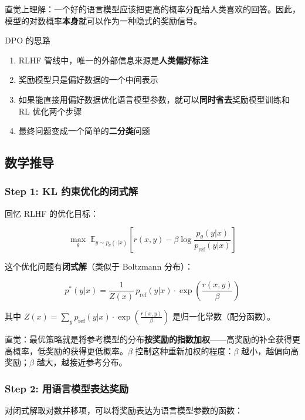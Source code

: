 \documentclass[a4paper]{article}
\begin{document}
直觉上理解：一个好的语言模型应该把更高的概率分配给人类喜欢的回答。因此，模型的对数概率\textbf{本身}就可以作为一种隐式的奖励信号。

\begin{importantbox}{DPO 的思路}
\begin{enumerate}
    \item RLHF 管线中，唯一的外部信息来源是\textbf{人类偏好标注}
    \item 奖励模型只是偏好数据的一个中间表示
    \item 如果能直接用偏好数据优化语言模型参数，就可以\textbf{同时省去}奖励模型训练和 RL 优化两个步骤
    \item 最终问题变成一个简单的\textbf{二分类}问题
\end{enumerate}
\end{importantbox}

\subsection{数学推导}

\subsubsection{Step 1: KL 约束优化的闭式解}

回忆 RLHF 的优化目标：

$$\max_\theta \; \mathbb{E}_{y \sim p_\theta(\cdot|x)} \left[ r(x, y) - \beta \log \frac{p_\theta(y|x)}{p_{\text{ref}}(y|x)} \right]$$

这个优化问题有\textbf{闭式解}（类似于 Boltzmann 分布）：

$$p^*(y|x) = \frac{1}{Z(x)} \, p_{\text{ref}}(y|x) \cdot \exp\left(\frac{r(x, y)}{\beta}\right)$$

其中 $Z(x) = \sum_y p_{\text{ref}}(y|x) \cdot \exp\left(\frac{r(x, y)}{\beta}\right)$ 是归一化常数（配分函数）。





直觉：最优策略就是将参考模型的分布\textbf{按奖励的指数加权}——高奖励的补全获得更高概率，低奖励的获得更低概率。$\beta$ 控制这种重新加权的程度：$\beta$ 越小，越偏向高奖励；$\beta$ 越大，越接近参考分布。

\subsubsection{Step 2: 用语言模型表达奖励}

对闭式解取对数并移项，可以将奖励表达为语言模型参数的函数：
\end{document}
